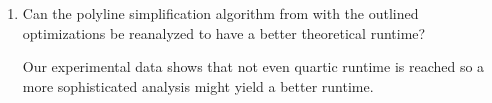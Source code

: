 \begin{enumerate}
\item Can the polyline simplification algorithm from \citeauthor{on_optimal_polyline_simplification_using_the_hausdorff_and_frechet_distance} with the outlined optimizations be reanalyzed to have a better theoretical runtime?

  Our experimental data shows that not even quartic runtime is reached so a more sophisticated analysis might yield a better runtime.
\end{enumerate}

